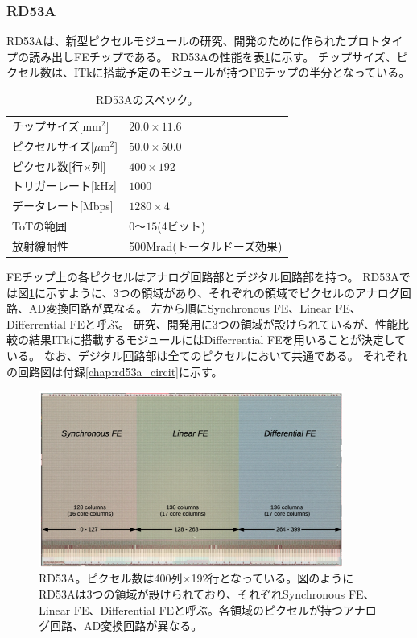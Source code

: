 \subsubsection{RD53A}
RD53A\cite{2-1}は、新型ピクセルモジュールの研究、開発のために作られたプロトタイプの読み出しFEチップである。
RD53Aの性能を表\ref{rd53a_spec}に示す。
チップサイズ、ピクセル数は、ITkに搭載予定のモジュールが持つFEチップの半分となっている。

\begin{table}[tbp]
\begin{center}
\caption[RD53Aのスペック]{RD53Aのスペック。}
\label{rd53a_spec}
  \begin{tabular}{|ll|} \hline
    チップサイズ[mm$^2$] & $20.0\times 11.6$ \\ 
    ピクセルサイズ[$\mu$m$^2$] & $50.0\times 50.0$ \\ 
    ピクセル数[行$\times$列] & $400\times 192$ \\ 
    トリガーレート[kHz] & $1000$ \\ 
    データレート[Mbps] & $1280\times4$ \\ 
    ToTの範囲 & $0〜15$(4ビット) \\
    放射線耐性 & 500Mrad(トータルドーズ効果\cite{2-4}) \\\hline
  \end{tabular}
\end{center}
\end{table}

FEチップ上の各ピクセルはアナログ回路部とデジタル回路部を持つ。
RD53Aでは図\ref{fechip_rd53a}に示すように、3つの領域があり、それぞれの領域でピクセルのアナログ回路、AD変換回路が異なる。
左から順にSynchronous FE、Linear FE、Differrential FEと呼ぶ。
研究、開発用に3つの領域が設けられているが、性能比較の結果ITkに搭載するモジュールにはDifferrential FEを用いることが決定している。
なお、デジタル回路部は全てのピクセルにおいて共通である。
それぞれの回路図は付録\ref{chap:rd53a_circit}に示す。

\begin{figure}[bpt]\centering
\includegraphics[width=10cm]{./fechip_rd53a.png}
\caption[RD53A]{RD53A\cite{2-1}。ピクセル数は400列$\times$192行となっている。図のようにRD53Aは3つの領域が設けられており、それぞれSynchronous FE、Linear FE、Differential FEと呼ぶ。各領域のピクセルが持つアナログ回路、AD変換回路が異なる。}
\label{fechip_rd53a}
\end{figure}


